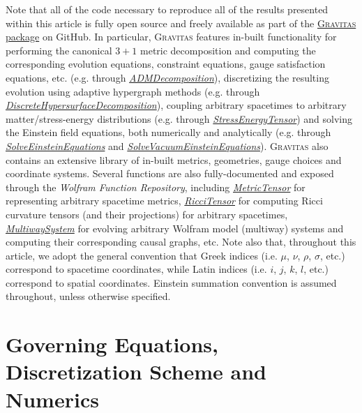 \documentclass{article}
\begin{document}
Note that all of the code necessary to reproduce all of the results presented within this article is fully open source and freely available as part of the \href{https://github.com/JonathanGorard/Gravitas}{\textsc{Gravitas} package} on GitHub. In particular, \textsc{Gravitas} features in-built functionality for performing the canonical ${3 + 1}$ metric decomposition and computing the corresponding evolution equations, constraint equations, gauge satisfaction equations, etc. (e.g. through \href{https://github.com/JonathanGorard/Gravitas/blob/main/ADMDecomposition.wl}{\textit{ADMDecomposition}}), discretizing the resulting evolution using adaptive hypergraph methods (e.g. through \href{https://github.com/JonathanGorard/Gravitas/blob/main/DiscreteHypersurfaceDecomposition.wl}{\textit{DiscreteHypersurfaceDecomposition}}), coupling arbitrary spacetimes to arbitrary matter/stress-energy distributions (e.g. through \href{https://github.com/JonathanGorard/Gravitas/blob/main/StressEnergyTensor.wl}{\textit{StressEnergyTensor}}) and solving the Einstein field equations, both numerically and analytically (e.g. through \href{https://github.com/JonathanGorard/Gravitas/blob/main/SolveEinsteinEquations.wl}{\textit{SolveEinsteinEquations}} and \href{https://github.com/JonathanGorard/Gravitas/blob/main/SolveVacuumEinsteinEquations.wl}{\textit{SolveVacuumEinsteinEquations}}). \textsc{Gravitas} also contains an extensive library of in-built metrics, geometries, gauge choices and coordinate systems. Several functions are also fully-documented and exposed through the \textit{Wolfram Function Repository}, including \href{https://resources.wolframcloud.com/FunctionRepository/resources/MetricTensor/}{\textit{MetricTensor}} for representing arbitrary spacetime metrics, \href{https://resources.wolframcloud.com/FunctionRepository/resources/RicciTensor}{\textit{RicciTensor}} for computing Ricci curvature tensors (and their projections) for arbitrary spacetimes, \href{https://resources.wolframcloud.com/FunctionRepository/resources/MultiwaySystem}{\textit{MultiwaySystem}} for evolving arbitrary Wolfram model (multiway) systems and computing their corresponding causal graphs, etc. Note also that, throughout this article, we adopt the general convention that Greek indices (i.e. ${\mu}$, ${\nu}$, ${\rho}$, ${\sigma}$, etc.) correspond to spacetime coordinates, while Latin indices (i.e. $i$, $j$, $k$, $l$, etc.) correspond to spatial coordinates. Einstein summation convention is assumed throughout, unless otherwise specified.

\section{Governing Equations, Discretization Scheme and Numerics}
\label{sec:Section1}
\end{document}
